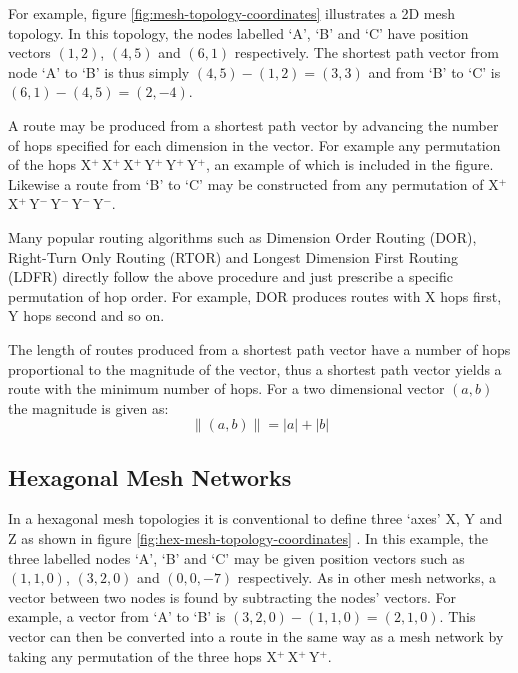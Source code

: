 			For example, figure \ref{fig:mesh-topology-coordinates} illustrates a 2D
			mesh topology. In this topology, the nodes labelled `A', `B' and `C' have
			position vectors $(1, 2)$, $(4, 5)$ and $(6, 1)$ respectively. The
			shortest path vector from node `A' to `B' is thus simply $(4, 5) - (1, 2)
			= (3, 3)$ and from `B' to `C' is $(6, 1) - (4, 5) = (2, -4)$.
			
			A route may be produced from a shortest path vector by advancing the
			number of hops specified for each dimension in the vector. For example
			any permutation of the hops X$^+\,$X$^+\,$X$^+\,$Y$^+\,$Y$^+\,$Y$^+$, an
			example of which is included in the figure. Likewise a route from `B' to
			`C' may be constructed from any permutation of
			X$^+\,$X$^+\,$Y$^-\,$Y$^-\,$Y$^-\,$Y$^-$.
			
			Many popular routing algorithms such as Dimension Order Routing (DOR),
			Right-Turn Only Routing (RTOR) and Longest Dimension First Routing (LDFR)
			\cite{dally04,davies12} directly follow the above procedure and just
			prescribe a specific permutation of hop order. For example, DOR produces
			routes with X hops first, Y hops second and so on.
			
			The length of routes produced from a shortest path vector have a number
			of hops proportional to the magnitude of the vector, thus a shortest path
			vector yields a route with the minimum number of hops. For a two
			dimensional vector $(a, b)$ the magnitude is given as:
			\begin{equation}
				\| (a, b) \| = \lvert a \rvert + \lvert b \rvert
			\end{equation}
		
		\subsection{Hexagonal Mesh Networks}
			
			In a hexagonal mesh topologies it is conventional to define three `axes'
			X, Y and Z as shown in figure \ref{fig:hex-mesh-topology-coordinates}
			\cite{patel15}. In this example, the three labelled nodes `A', `B' and
			`C' may be given position vectors such as $(1, 1, 0)$, $(3, 2, 0)$ and $(0,
			0, -7)$ respectively. As in other mesh networks, a vector between two
			nodes is found by subtracting the nodes' vectors. For example, a vector
			from `A' to `B' is $(3, 2, 0) - (1, 1, 0) = (2, 1, 0)$. This vector can
			then be converted into a route in the same way as a mesh network
			by taking any permutation of the three hops  X$^+\,$X$^+\,$Y$^+$.
			
